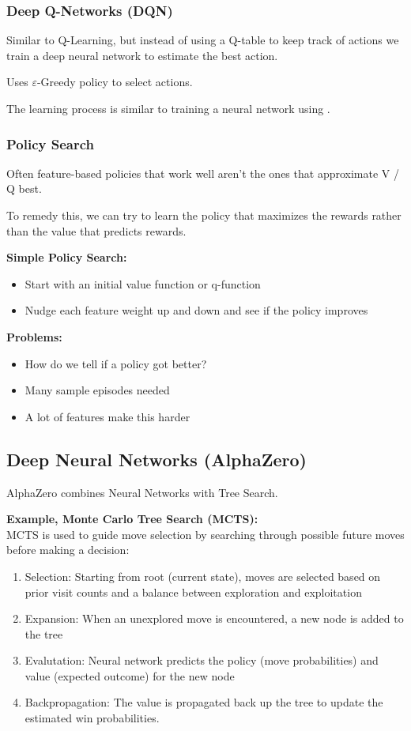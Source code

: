 \documentclass[
../../EiKI_Summary.tex,
]
{subfiles}
\begin{document}
\subsubsection{Deep Q-Networks (DQN)}
Similar to Q-Learning, but instead of using a Q-table to keep track of actions we train a deep neural network to estimate the best action. 

Uses $\varepsilon$-Greedy policy to select actions.

The learning process is similar to training a neural network using .


\subsubsection{Policy Search}
Often feature-based policies that work well aren't the ones that approximate V / Q best. 

To remedy this, we can try to learn the policy that maximizes the rewards rather than the value that predicts rewards.

\textbf{Simple Policy Search:}
\begin{itemize}
    \item Start with an initial value function or q-function
    \item Nudge each feature weight up and down and see if the policy improves
\end{itemize}

\textbf{Problems:}
\begin{itemize}
    \item How do we tell if a policy got better?
    \item Many sample episodes needed
    \item A lot of features make this harder
\end{itemize}

\subsection{Deep Neural Networks (AlphaZero)}
AlphaZero combines Neural Networks with Tree Search. 

\textbf{Example, Monte Carlo Tree Search (MCTS):}\\
MCTS is used to guide move selection by searching through possible future moves before making a decision:
\begin{enumerate}
    \item Selection: Starting from root (current state), moves are selected based on prior visit counts and a balance between exploration and exploitation
    \item Expansion: When an unexplored move is encountered, a new node is added to the tree
    \item Evalutation: Neural network predicts the policy (move probabilities) and value (expected outcome) for the new node
    \item Backpropagation: The value is propagated back up the tree to update the estimated win probabilities.
\end{enumerate}
\end{document}
